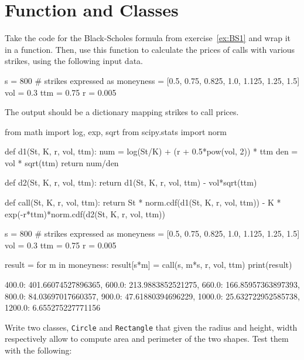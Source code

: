 \chapter{Function and Classes}\label{introduction-to-python---lesson-4}

\begin{question}
Take the code for the Black-Scholes formula from exercise~\ref{ex:BS1} and wrap it in a function. Then, use this function to calculate the prices of calls with various strikes, using the following input data.
\end{question}

\begin{ipython}
s = 800 
# strikes expressed as %
moneyness = [0.5, 0.75, 0.825, 1.0, 1.125, 1.25, 1.5]
vol = 0.3
ttm = 0.75
r = 0.005
\end{ipython}

The output should be a dictionary mapping strikes to call prices.

\begin{solution}
\end{solution}

\begin{ipython}
from math import log, exp, sqrt
from scipy.stats import norm

def d1(St, K, r, vol, ttm):
    num = log(St/K) + (r + 0.5*pow(vol, 2)) * ttm
    den = vol * sqrt(ttm)
    return num/den

def d2(St, K, r, vol, ttm):
    return d1(St, K, r, vol, ttm) - vol*sqrt(ttm)

def call(St, K, r, vol, ttm):
    return St * norm.cdf(d1(St, K, r, vol, ttm)) - K * exp(-r*ttm)*norm.cdf(d2(St, K, r, vol, ttm))

s = 800
# strikes expressed as %
moneyness = [0.5, 0.75, 0.825, 1.0, 1.125, 1.25, 1.5]
vol = 0.3
ttm = 0.75
r = 0.005

result = {}
for m in moneyness:
    result[s*m] = call(s, m*s, r, vol, ttm)
print(result)

{400.0: 401.66074527896365,
  600.0: 213.9883852521275,
  660.0: 166.85957363897393,
  800.0: 84.03697017660357,
  900.0: 47.61880394696229,
  1000.0: 25.632722952585738,
  1200.0: 6.655275227771156}
\end{ipython}

\begin{question}
Write two classes, \texttt{Circle} and \texttt{Rectangle} that given the radius and height, width respectively allow to compute area and perimeter of the two shapes. Test them with the following:
\end{question}

